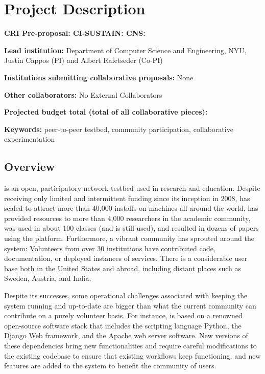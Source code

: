 
\section{Project Description}


\textbf{CRI Pre-proposal: CI-SUSTAIN: CNS: \proposalname}

\textbf{Lead institution:} Department of Computer Science and Engineering, NYU, Justin Cappos (PI) and Albert Rafetseder (Co-PI)

\textbf{Institutions submitting collaborative proposals:} None

\textbf{Other collaborators:} No External Collaborators

\textbf{Projected budget total (total of all collaborative pieces):} \budget

\textbf{Keywords:} peer-to-peer testbed, community participation,
collaborative experimentation


\subsection{Overview}

\sysname is an open, participatory network testbed used in research
and education. Despite receiving only limited and intermittent
funding since its inception in 2008, \sysname has scaled to attract
more than 40,000 installs on machines all around the world, has
provided resources to more than 4,000 researchers in the academic
community, was used in about 100 classes (and is still used), and
resulted in dozens of papers using the platform.
Furthermore, a vibrant community has sprouted around the system:
Volunteers from over 30 institutions have contributed code,
documentation, or deployed instances of \sysname services.
There is a considerable user base both in the United States
and abroad, including distant places such as Sweden, Austria, and India.

Despite its successes, some operational challenges associated with
keeping the system running and up-to-date are bigger than what the
current \sysname community can contribute on a purely volunteer
basis.
For instance, \sysname is based on a renowned open-source software
stack that includes the scripting language Python, the Django Web
framework, and the Apache web server software. New versions of
these dependencies bring new functionalities and require careful
modifications to the existing codebase to ensure that existing
workflows keep functioning, and new features are added to the
system to benefit the community of users.


